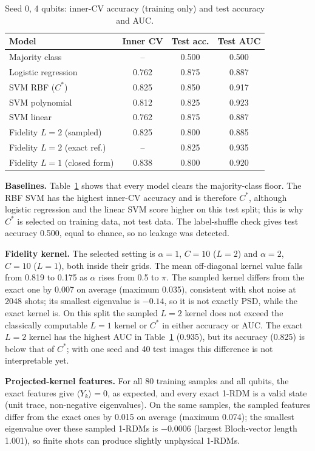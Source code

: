 \documentclass[conference]{IEEEtran}
\begin{document}
\begin{table}[t]
\centering
\caption{Seed 0, 4 qubits: inner-CV accuracy (training only) and test accuracy and AUC.}
\label{tab:week1}
\footnotesize
\begin{tabular}{@{}lccc@{}}
\toprule
Model & Inner CV & Test acc. & Test AUC \\
\midrule
Majority class & -- & 0.500 & 0.500 \\
Logistic regression & 0.762 & 0.875 & 0.887 \\
SVM RBF ($C^\ast$) & 0.825 & 0.850 & 0.917 \\
SVM polynomial & 0.812 & 0.825 & 0.923 \\
SVM linear & 0.762 & 0.875 & 0.887 \\
\midrule
Fidelity $L=2$ (sampled) & 0.825 & 0.800 & 0.885 \\
Fidelity $L=2$ (exact ref.) & -- & 0.825 & 0.935 \\
Fidelity $L=1$ (closed form) & 0.838 & 0.800 & 0.920 \\
\bottomrule
\end{tabular}
\end{table}

\textbf{Baselines.} Table~\ref{tab:week1} shows that every model clears the majority-class floor. The RBF SVM has the highest inner-CV accuracy and is therefore $C^\ast$, although logistic regression and the linear SVM score higher on this test split; this is why $C^\ast$ is selected on training data, not test data. The label-shuffle check gives test accuracy 0.500, equal to chance, so no leakage was detected.

\textbf{Fidelity kernel.} The selected setting is $\alpha=1$, $C=10$ ($L=2$) and $\alpha=2$, $C=10$ ($L=1$), both inside their grids. The mean off-diagonal kernel value falls from 0.819 to 0.175 as $\alpha$ rises from 0.5 to $\pi$. The sampled kernel differs from the exact one by 0.007 on average (maximum 0.035), consistent with shot noise at 2048 shots; its smallest eigenvalue is $-0.14$, so it is not exactly PSD, while the exact kernel is. On this split the sampled $L=2$ kernel does not exceed the classically computable $L=1$ kernel or $C^\ast$ in either accuracy or AUC. The exact $L=2$ kernel has the highest AUC in Table~\ref{tab:week1} (0.935), but its accuracy (0.825) is below that of $C^\ast$; with one seed and 40 test images this difference is not interpretable yet.

\textbf{Projected-kernel features.} For all 80 training samples and all qubits, the exact features give $\langle Y_k\rangle=0$, as expected, and every exact 1-RDM is a valid state (unit trace, non-negative eigenvalues). On the same samples, the sampled features differ from the exact ones by 0.015 on average (maximum 0.074); the smallest eigenvalue over these sampled 1-RDMs is $-0.0006$ (largest Bloch-vector length 1.001), so finite shots can produce slightly unphysical 1-RDMs.
\end{document}
